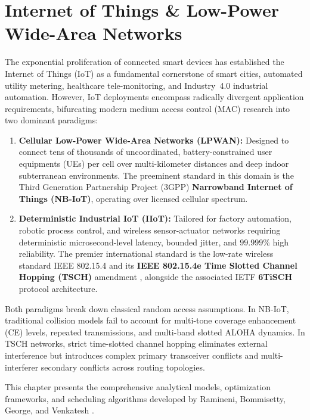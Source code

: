 \chapter{Internet of Things \& Low-Power Wide-Area Networks}
\label{sec:chapter8}

The exponential proliferation of connected smart devices has established the Internet of Things (IoT) as a fundamental cornerstone of smart cities, automated utility metering, healthcare tele-monitoring, and Industry~4.0 industrial automation. However, IoT deployments encompass radically divergent application requirements, bifurcating modern medium access control (MAC) research into two dominant paradigms:
\begin{enumerate}
    \item \textbf{Cellular Low-Power Wide-Area Networks (LPWAN):} Designed to connect tens of thousands of uncoordinated, battery-constrained user equipments (UEs) per cell over multi-kilometer distances and deep indoor subterranean environments. The preeminent standard in this domain is the Third Generation Partnership Project (3GPP) \textbf{Narrowband Internet of Things (NB-IoT)}, operating over licensed cellular spectrum.
    \item \textbf{Deterministic Industrial IoT (IIoT):} Tailored for factory automation, robotic process control, and wireless sensor-actuator networks requiring deterministic microsecond-level latency, bounded jitter, and $99.999\%$ high reliability. The premier international standard is the low-rate wireless standard IEEE 802.15.4 \cite{ieee802154_2020} and its \textbf{IEEE 802.15.4e Time Slotted Channel Hopping (TSCH)} amendment \cite{ieee802154e_2012}, alongside the associated IETF \textbf{6TiSCH} protocol architecture.
\end{enumerate}

Both paradigms break down classical random access assumptions. In NB-IoT, traditional collision models fail to account for multi-tone coverage enhancement (CE) levels, repeated transmissions, and multi-band slotted ALOHA dynamics. In TSCH networks, strict time-slotted channel hopping eliminates external interference but introduces complex primary transceiver conflicts and multi-interferer secondary conflicts across routing topologies.

This chapter presents the comprehensive analytical models, optimization frameworks, and scheduling algorithms developed by Ramineni, Bommisetty, George, and Venkatesh \cite{ramineni2022performance, ramineni2019impact, bommisetty2022dplls, bommisetty2023cbpf, george2018performance, george2020multipacket}.

